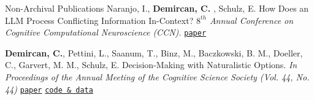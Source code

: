
\begin{rubric}{Non-Archival Publications}
    \entry*[2025]
    Naranjo, I., \textbf{Demircan, C.} , Schulz, E. How Does an LLM Process Conflicting Information In-Context? \emph{$8^{th}$ Annual Conference on Cognitive Computational Neuroscience (CCN).} {\href{https://2025.ccneuro.org/abstract_pdf/Coronel_2025_How_Does_LLM_Process_Conflicting_Information.pdf}{\textcolor{MarkerColour}{\lbrack\texttt{paper}\rbrack}}}

    \entry*[2022]
    \textbf{Demircan, C.}, Pettini, L., Saanum, T., Binz, M., Baczkowski, B. M., Doeller, C., Garvert, M. M., Schulz, E. Decision-Making with Naturalistic Options. \emph{In Proceedings of the Annual Meeting of the Cognitive Science Society (Vol. 44, No. 44)} {\href{https://escholarship.org/content/qt1td8q3wn/qt1td8q3wn.pdf}{\textcolor{MarkerColour}{\lbrack\texttt{paper}\rbrack}}} {\href{https://github.com/candemircan/THINGSDecisions}{\textcolor{MarkerColour}{\lbrack\texttt{code \& data}\rbrack}}} \par

\end{rubric}